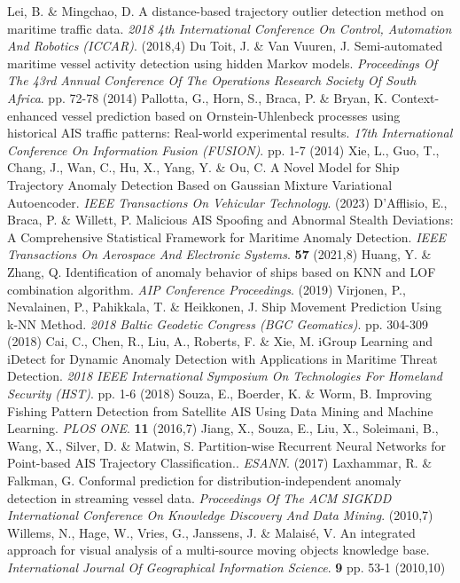 Lei, B. \& Mingchao, D. A distance-based trajectory outlier detection method on maritime traffic data. {\em 2018 4th International Conference On Control, Automation And Robotics (ICCAR)}. (2018,4)
Du Toit, J. \& Van Vuuren, J. Semi-automated maritime vessel activity detection using hidden Markov models. {\em Proceedings Of The 43rd Annual Conference Of The Operations Research Society Of South Africa}. pp. 72-78 (2014)
Pallotta, G., Horn, S., Braca, P. \& Bryan, K. Context-enhanced vessel prediction based on Ornstein-Uhlenbeck processes using historical AIS traffic patterns: Real-world experimental results. {\em 17th International Conference On Information Fusion (FUSION)}. pp. 1-7 (2014)
Xie, L., Guo, T., Chang, J., Wan, C., Hu, X., Yang, Y. \& Ou, C. A Novel Model for Ship Trajectory Anomaly Detection Based on Gaussian Mixture Variational Autoencoder. {\em IEEE Transactions On Vehicular Technology}. (2023)
D'Afflisio, E., Braca, P. \& Willett, P. Malicious AIS Spoofing and Abnormal Stealth Deviations: A Comprehensive Statistical Framework for Maritime Anomaly Detection. {\em IEEE Transactions On Aerospace And Electronic Systems}. \textbf{57} (2021,8)
Huang, Y. \& Zhang, Q. Identification of anomaly behavior of ships based on KNN and LOF combination algorithm. {\em AIP Conference Proceedings}. (2019)
Virjonen, P., Nevalainen, P., Pahikkala, T. \& Heikkonen, J. Ship Movement Prediction Using k-NN Method. {\em 2018 Baltic Geodetic Congress (BGC Geomatics)}. pp. 304-309 (2018)
Cai, C., Chen, R., Liu, A., Roberts, F. \& Xie, M. iGroup Learning and iDetect for Dynamic Anomaly Detection with Applications in Maritime Threat Detection. {\em 2018 IEEE International Symposium On Technologies For Homeland Security (HST)}. pp. 1-6 (2018)
Souza, E., Boerder, K. \& Worm, B. Improving Fishing Pattern Detection from Satellite AIS Using Data Mining and Machine Learning. {\em PLOS ONE}. \textbf{11} (2016,7)
Jiang, X., Souza, E., Liu, X., Soleimani, B., Wang, X., Silver, D. \& Matwin, S. Partition-wise Recurrent Neural Networks for Point-based AIS Trajectory Classification.. {\em ESANN}. (2017)
Laxhammar, R. \& Falkman, G. Conformal prediction for distribution-independent anomaly detection in streaming vessel data. {\em Proceedings Of The ACM SIGKDD International Conference On Knowledge Discovery And Data Mining}. (2010,7)
Willems, N., Hage, W., Vries, G., Janssens, J. \& Malaisé, V. An integrated approach for visual analysis of a multi-source moving objects knowledge base. {\em International Journal Of Geographical Information Science}. \textbf{9} pp. 53-1 (2010,10)
